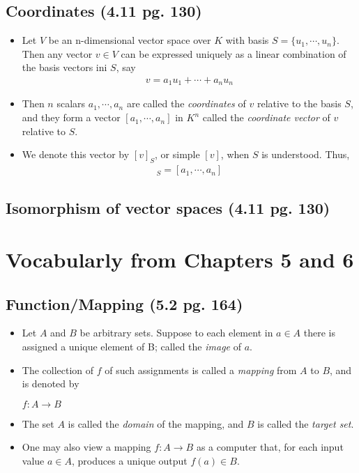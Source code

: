 \documentclass[hidelinks, 11pt, openleft]{scrartcl}
\begin{document}
    \subsection*{Coordinates (4.11 pg. 130)}
    \begin{itemize}
        \item Let $V$ be an n-dimensional vector space over $K$ with basis $S=\{u_1, \cdots , u_n\}$. Then any vector $v \in V$ can be expressed uniquely as a linear combination of the basis vectors ini $S$, say
        \begin{align*}
            v = a_1u_1 + \cdots + a_nu_n
        \end{align*}
        \item Then $n$ scalars $a_1, \cdots , a_n$ are called the \textit{coordinates} of $v$ relative to the basis $S$, and they form a vector $[a_1, \cdots , a_n]$ in $K^n$ called the \textit{coordinate vector} of $v$ relative to $S$. 
        \item We denote this vector by $[v]_S$, or simple $[v]$, when $S$ is understood. Thus,
        \begin{align*}
            [v]_S = [a_1, \cdots , a_n]
        \end{align*}
    \end{itemize}
    
    \subsection*{Isomorphism of vector spaces (4.11 pg. 130)}
    \vspace{10 cm}
    
    
\section{Vocabularly from Chapters 5 and 6}

\subsection*{Function/Mapping (5.2 pg. 164)}
\begin{itemize}
    \item Let $A$ and $B$ be arbitrary sets. Suppose to each element in $a \in A$ there is assigned a unique element of B; called the \textit{image} of $a$. 
    \item The collection of $f$ of such assignments is called a \textit{mapping} from $A$ to $B$, and is denoted by
        \begin{center}
            $f: A \to B$
        \end{center}
    \item The set $A$ is called the \textit{domain} of the mapping, and $B$ is called the \textit{target set}.
    \item One may also view a mapping $f: A \to B$ as a computer that, for each input value $a \in A$, produces a unique output $f(a) \in B$.
\end{itemize}
\end{document}
